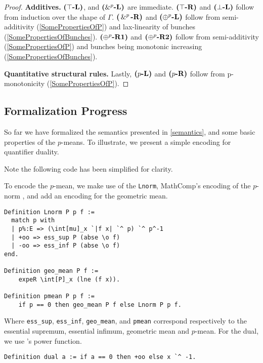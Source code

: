 \begin{proof}
    \textbf{Additives.} ${\normalfont \textbf{($\top$-L)}}$, and ${\normalfont \textbf{($\&^p$-L)}}$ are immediate. ${\normalfont \textbf{($\top$-R)}}$ and ${\normalfont \textbf{($\bot$-L)}}$ follow from induction over the shape of $\Gamma$. ${\normalfont \textbf{($\,\&^{p}\,$-R)}}$ and ${\normalfont \textbf{($\oplus^{p}$-L)}}$ follow from semi-additivity (\cref{SomePropertiesOfP}) and lax-linearity of bunches (\cref{SomePropertiesOfBunches}). ${\normalfont \textbf{($\oplus^{p}$-R1)}}$ and ${\normalfont \textbf{($\oplus^{p}$-R2)}}$ follow from semi-additivity (\cref{SomePropertiesOfP}) and bunches being monotonic increasing (\cref{SomePropertiesOfBunches}).

    \textbf{Quantitative structural rules.} Lastly, ${\normalfont \textbf{($p$-L)}}$ and ${\normalfont \textbf{($p$-R)}}$ follow from p-monotonicity (\cref{SomePropertiesOfP}). 

\end{proof}

\subsection{Formalization Progress}

So far we have formalized the semantics presented in \cref{semantics}, and some basic properties of the $p$-means. To illustrate, we present a simple encoding for quantifier duality.


Note the following code has been simplified for clarity.

To encode the $p$-mean, we make use of the \texttt{Lnorm}, MathComp's encoding of the $p$-norm \cite{lpspaces}, and add an encoding for the geometric mean. 
\begin{verbatim}
Definition Lnorm P p f :=
  match p with
  | p%:E => (\int[mu]_x `|f x| `^ p) `^ p^-1
  | +oo => ess_sup P (abse \o f)
  | -oo => ess_inf P (abse \o f)
end.

Definition geo_mean P f :=  
    expeR \int[P]_x (lne (f x)). 

Definition pmean P p f := 
    if p == 0 then geo_mean P f else Lnorm P p f.
\end{verbatim}

Where \texttt{ess\_sup}, \texttt{ess\_inf},  \texttt{geo\_mean}, and \texttt{pmean} correspond respectively to the essential supremum, essential infimum, geometric mean and $p$-mean. For the dual, we use \mathcomp{}'s power function.
\begin{verbatim}
Definition dual a := if a == 0 then +oo else x `^ -1.
\end{verbatim}

